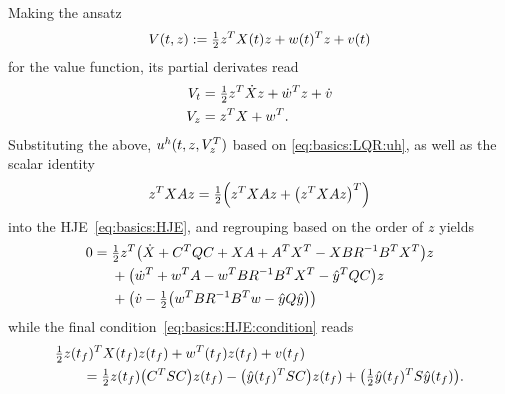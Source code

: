 Making the ansatz
\begin{equation}
\label{eq:basics:LQR:ansatz}
  V(t,z) := \tfrac{1}{2} z^T X(t) z + w(t)^T z + v(t)
\end{equation}
for the value function,
its partial derivates read
\begin{equation}
\begin{aligned}
  V_t &= \tfrac{1}{2} z^T \dot X z + \dot w^T z + \dot v \\
  V_z &= z^T X + w^T
  .
\end{aligned}
\end{equation}
Substituting the above, $u^h(t, z, V_z^T)$ based on \eqref{eq:basics:LQR:uh},
as well as the scalar identity
\begin{equation}
  z^T X A z = \tfrac{1}{2} \Big( z^T X A z + \big( z^T X A z \big)^T \Big)
\end{equation}
into the \ac{HJE}~\eqref{eq:basics:HJE},
and regrouping based on the order of $z$ yields
\begin{subequations}
\label{eq:basics:LQR:HJE}
\begin{align}
  0 ={}
\label{eq:basics:LQR:HJE:X}
  & \tfrac{1}{2} z^T \big( \dot X + C^T Q C + X A + A^T X^T - X B R^{-1} B^T X^T \big) z \\
  & + \big( \dot w^T + w^T A - w^T B R^{-1} B^T X^T - \hat y^T Q C \big) z \\
  & + \big( \dot v - \tfrac{1}{2} \big( w^T B R^{-1} B^T w - \hat y Q \hat y \big) \big)
\end{align}
\end{subequations}
while the final condition~\eqref{eq:basics:HJE:condition} reads
\begin{equation}
\label{eq:basics:LQR:condition}
\begin{aligned}
  \MoveEqLeft
  \onehalf z(t_f)^\T X(t_f) z(t_f) + w^\T (t_f) z(t_f) + v(t_f)
  \\
  &= \onehalf z(t_f) \big( C^\T S C \big) z(t_f)
  - \big( \hat y(t_f)^\T S C \big) z(t_f)
  + \big( \onehalf \hat y(t_f)^\T S \hat y(t_f) \big)
  .
\end{aligned}
\end{equation}

